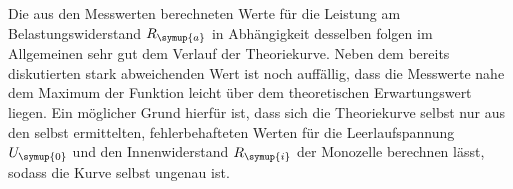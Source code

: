 Die aus den Messwerten berechneten Werte für die Leistung am Belastungswiderstand
$R_{\symup{a}}$ in Abhängigkeit desselben folgen im Allgemeinen sehr gut dem Verlauf
der Theoriekurve. Neben dem bereits diskutierten stark abweichenden Wert ist noch
auffällig, dass die Messwerte nahe dem Maximum der Funktion leicht über dem theoretischen
Erwartungswert liegen. Ein möglicher Grund hierfür ist, dass sich die Theoriekurve selbst
nur aus den selbst ermittelten, fehlerbehafteten Werten für die Leerlaufspannung
$U_{\symup{0}}$ und den Innenwiderstand $R_{\symup{i}}$ der Monozelle
berechnen lässt, sodass die Kurve selbst ungenau ist.
